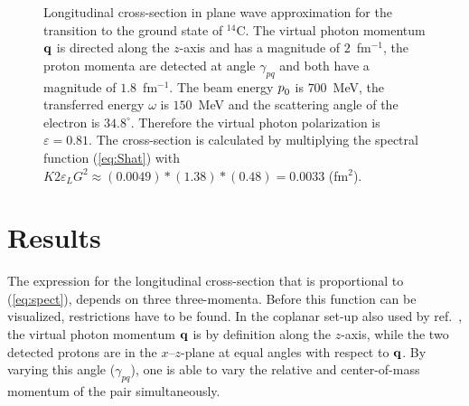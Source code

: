 \begin{figure}[t]
\centerline{}
\caption[]{
Longitudinal cross-section in plane wave approximation for the transition to 
the ground state of $^{14}$C. The virtual photon
momentum ${\bf q}$ is directed along the $z$-axis and has a magnitude of
$2$~fm$^{-1}$, the proton momenta are detected at angle $\gamma_{pq}$ and 
both have a magnitude of $1.8$~fm$^{-1}$.  
The beam energy $p\phpr_0$ is $700$~MeV, 
the transferred energy $\omega$ is $150$~MeV and the scattering angle of the 
electron is $34.8^\circ$. Therefore the virtual photon polarization is
$\varepsilon=0.81$. The cross-section is calculated by multiplying the 
spectral function (\ref{eq:Shat}) with 
$K2\varepsilon_L G^2\approx (0.0049)\ast(1.38)\ast(0.48) = 0.0033$ (fm$^2$).
\label{fig:GP0}
}
\end{figure}
\section{Results\label{sec:CROSSresults}}
The expression for the longitudinal cross-section that is proportional to 
(\ref{eq:spect}), depends on three three-momenta. Before this function can 
be visualized, restrictions have to be found. 
In the coplanar set-up also used by ref.~\cite{GP91}, 
the virtual photon momentum ${\bf q}$ is 
by definition along the $z$-axis, while the two detected protons are in the
$x$--$z$-plane at equal angles with respect to ${\bf q}$. By varying this 
angle ($\gamma_{pq}$), one is able to vary the relative and center-of-mass
momentum of the pair simultaneously.


